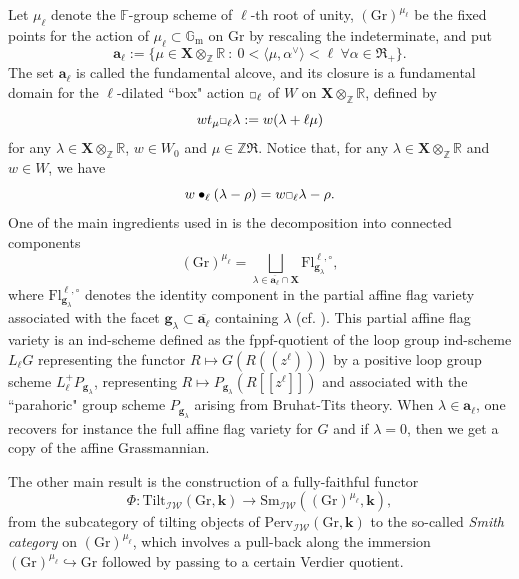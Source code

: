 \documentclass[11pt]{amsart}
\theoremstyle{plain}
\theoremstyle{remark}
\newcommand{\car}{\mbox{\relsize{-5}$\Box$}}
\numberwithin{equation}{section}
\begin{document}
	Let $\mu_\ell$ denote the $\mathbb{F}$-group scheme of $\ell$-th root of unity, $(\mathrm{Gr})^{\mu_\ell}$ be the fixed points for the action of $\mu_\ell\subset\mathbb{G}_\mathrm{m}$ on $\mathrm{Gr}$ by rescaling the indeterminate, and put $$\mathbf{a}_\ell:=\{\mu\in\mathbf{X}\otimes_\mathbb{Z}\mathbb{R}~:~0<\langle \mu,\alpha^\vee\rangle<\ell~\forall\alpha\in\mathfrak{R}_+\}.$$ The set $\mathbf{a}_\ell$ is called the fundamental alcove, and its closure is a fundamental domain for the $\ell$-dilated ``box" action $\car_\ell$ of $W$ on $\mathbf{X}\otimes_\mathbb{Z}\mathbb{R}$, defined by
	$$wt_\mu\car_{\ell}\lambda:=w(\lambda+\ell\mu)$$ 
	for any $\lambda\in \mathbf{X}\otimes_\mathbb{Z}\mathbb{R}$, $w\in W_{0}$ and $\mu\in \mathbb{Z}\mathfrak{R}$. Notice that, for any $\lambda\in \mathbf{X}\otimes_\mathbb{Z}\mathbb{R}$ and $w\in W$, we have
	\begin{equation}\label{boxvsbullet}
	    w\bullet_\ell(\lambda-\rho)=w\car_\ell\lambda-\rho. 
	\end{equation}
	One of the main ingredients used in \cite{riche2020smithtreumann} is the decomposition into connected components
	$$(\mathrm{Gr})^{\mu_\ell}=\bigsqcup_{\lambda\in \overline{\mathbf{a}_\ell}\cap\mathbf{X}}\mathrm{Fl}^{\ell,\circ}_{\mathbf{g}_\lambda}, $$
	where $\mathrm{Fl}^{\ell,\circ}_{\mathbf{g}_\lambda}$ denotes the identity component in the partial affine flag variety associated with the facet $\mathbf{g}_\lambda\subset \overline{\mathbf{a}_\ell}$ containing $\lambda$ (cf. \cite[Proposition 4.7]{riche2020smithtreumann}). This partial affine flag variety is an ind-scheme defined as the fppf-quotient of the loop group ind-scheme $L_\ell G$ representing the functor $R\mapsto G(R((z^\ell)))$ by a positive loop group scheme $L_\ell^+P_{\mathbf{g}_\lambda}$, representing $R\mapsto P_{\mathbf{g}_\lambda}(R[[z^\ell]])$ and associated with the ``parahoric" group scheme $P_{\mathbf{g}_\lambda}$ arising from Bruhat-Tits theory. When $\lambda\in\mathbf{a}_\ell$, one recovers for instance the full affine flag variety for $G$ and if $\lambda=0$, then we get a copy of the affine Grassmannian.  
	
	The other main result is the construction of a fully-faithful functor 
	$$\Phi:\mathrm{Tilt}_{\mathcal{IW}}(\mathrm{Gr},\mathbf{k})\to \mathrm{Sm}_{\mathcal{IW}}((\mathrm{Gr})^{\mu_\ell},\mathbf{k}), $$
	from the subcategory of tilting objects of $\mathrm{Perv}_{\mathcal{IW}}(\mathrm{Gr},\mathbf{k})$ to the so-called \textit{Smith category} on $(\mathrm{Gr})^{\mu_\ell}$, which involves a pull-back along the immersion $(\mathrm{Gr})^{\mu_\ell}\hookrightarrow \mathrm{Gr}$ followed by passing to a certain Verdier quotient. 
	
\end{document}

